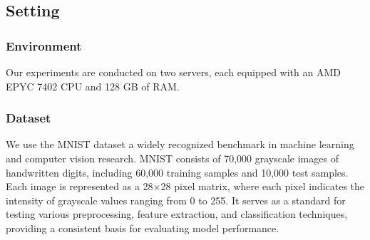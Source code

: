\documentclass[conference]{IEEEtran}
\begin{document}
\subsection{Setting}
\subsubsection{Environment} Our experiments are conducted on two servers, each equipped with an AMD EPYC 7402 CPU and 128 GB of RAM.






\subsubsection{Dataset} 
We use the MNIST dataset \cite{xiao2017fashion} a widely recognized benchmark in machine learning and computer vision research. MNIST consists of 70,000 grayscale images of handwritten digits, including 60,000 training samples and 10,000 test samples. Each image is represented as a 28$\times$28 pixel matrix, where each pixel indicates the intensity of grayscale values ranging from 0 to 255. 
It serves as a standard for testing various preprocessing, feature extraction, and classification techniques, providing a consistent basis for evaluating model performance.
\end{document}
